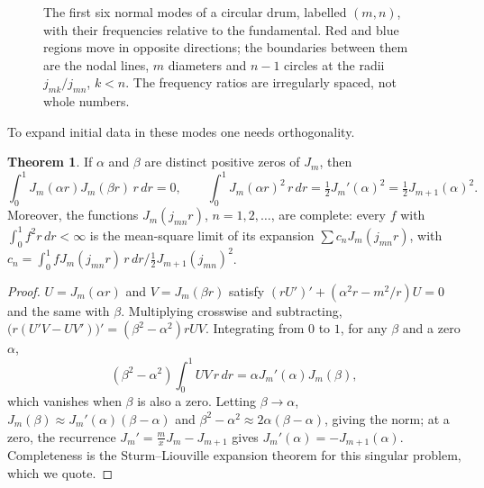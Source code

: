 \documentclass[11pt,a4paper]{article}
\numberwithin{equation}{section}
\theoremstyle{definition}
\newtheorem{thm}{Theorem}[subsection]
\begin{document}
\begin{figure}[H]
\caption{The first six normal modes of a circular drum, labelled $(m, n)$, with their frequencies relative to the fundamental. Red and blue regions move in opposite directions; the boundaries between them are the nodal lines, $m$ diameters and $n - 1$ circles at the radii $j_{mk}/j_{mn}$, $k < n$. The frequency
ratios are irregularly spaced, not whole numbers.}
\label{fig:drum}
\end{figure}

To expand initial data in these modes one needs orthogonality.

\begin{thm}
\label{thm:besselorth}
If $\alpha$ and $\beta$ are distinct positive zeros of $J_m$, then
\[
\int_0^1J_m(\alpha r)J_m(\beta r)\,r\,dr = 0, \qquad \int_0^1J_m(\alpha r)^2\,r\,dr = \tfrac12J_m'(\alpha)^2 = \tfrac12J_{m + 1}(\alpha)^2 .
\]
Moreover, the functions $J_m(j_{mn}r)$, $n = 1, 2, \ldots$, are complete: every $f$ with $\int_0^1f^2r\,dr < \infty$ is the mean-square limit of its expansion $\sum c_nJ_m(j_{mn}r)$, with $c_n = \int_0^1fJ_m(j_{mn}r)\,r\,dr\big/\frac12J_{m + 1}(j_{mn})^2$.
\end{thm}

\begin{proof}
$U = J_m(\alpha r)$ and $V = J_m(\beta r)$ satisfy $(rU')' + (\alpha^2r - m^2/r)U = 0$ and the same with $\beta$. Multiplying crosswise and subtracting, $\bigl(r(U'V - UV')\bigr)' = (\beta^2 - \alpha^2)rUV$. Integrating from $0$ to $1$, for any $\beta$ and a zero $\alpha$,
\[
(\beta^2 - \alpha^2)\int_0^1UV\,r\,dr = \alpha J_m'(\alpha)J_m(\beta) ,
\]
which vanishes when $\beta$ is also a zero. Letting $\beta \to \alpha$, $J_m(\beta) \approx J_m'(\alpha)(\beta - \alpha)$ and $\beta^2 - \alpha^2 \approx 2\alpha(\beta - \alpha)$, giving the norm; at a zero, the recurrence $J_m' = \frac mxJ_m - J_{m + 1}$ gives $J_m'(\alpha) = -J_{m + 1}(\alpha)$. Completeness is the Sturm--Liouville expansion theorem for
this singular problem, which we quote.
\end{proof}
\end{document}
